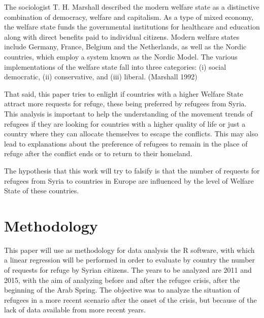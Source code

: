 \documentclass[]{elsarticle} %
\begin{document}
The sociologist T. H. Marshall described the modern welfare state as a
distinctive combination of democracy, welfare and capitalism. As a type
of mixed economy, the welfare state funds the governmental institutions
for healthcare and education along with direct benefits paid to
individual citizens. Modern welfare states include Germany, France,
Belgium and the Netherlands, as well as the Nordic countries, which
employ a system known as the Nordic Model. The various implementations
of the welfare state fall into three categories: (i) social democratic,
(ii) conservative, and (iii) liberal. (Marshall 1992)

That said, this paper tries to enlight if countries with a higher
Welfare State attract more requests for refuge, these being preferred by
refugees from Syria. This analysis is important to help the
understanding of the movement trends of refugees if they are looking for
countries with a higher quality of life or just a country where they can
allocate themselves to escape the conflicts. This may also lead to
explanations about the preference of refugees to remain in the place of
refuge after the conflict ends or to return to their homeland.

The hypothesis that this work will try to falsify is that the number of
requests for refugees from Syria to countries in Europe are influenced
by the level of Welfare State of these countries.

\section{Methodology}\label{methodology}

This paper will use as methodology for data analysis the R software,
with which a linear regression will be performed in order to evaluate by
country the number of requests for refuge by Syrian citizens. The years
to be analyzed are 2011 and 2015, with the aim of analyzing before and
after the refugee crisis, after the beginning of the Arab Spring. The
objective was to analyze the situation of refugees in a more recent
scenario after the onset of the crisis, but because of the lack of data
available from more recent years.
\end{document}
